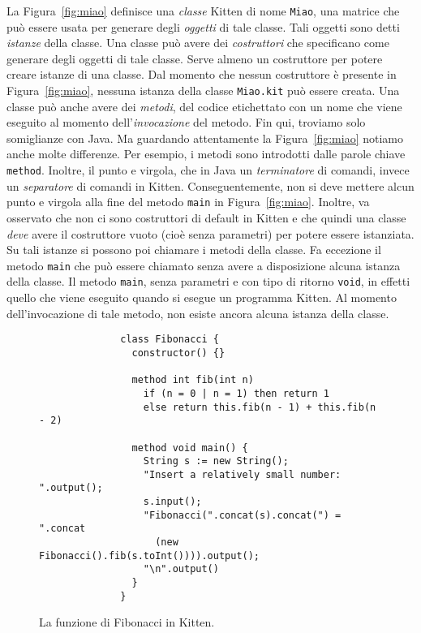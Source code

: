 La Figura~\ref{fig:miao} definisce una \emph{classe} Kitten di nome
\texttt{Miao}, \cioe una
matrice che pu\`o essere usata per generare degli \emph{oggetti} di tale
classe. Tali oggetti sono detti \emph{istanze} della classe.
Una classe pu\`o avere dei \emph{costruttori} che specificano come
generare degli oggetti di tale classe. Serve almeno un costruttore
per potere creare istanze di una classe. Dal momento che nessun costruttore
\`e presente in Figura~\ref{fig:miao}, nessuna istanza della classe
\texttt{Miao.kit} pu\`o essere creata. Una classe pu\`o anche avere
dei \emph{metodi}, \cioe del codice etichettato con un nome che viene
eseguito al momento dell'\emph{invocazione} del metodo. Fin qui, troviamo
solo somiglianze con Java. Ma guardando attentamente la Figura~\ref{fig:miao}
notiamo anche molte differenze. Per esempio, i metodi
sono introdotti dalle parole chiave \texttt{method}.
Inoltre, il punto e virgola, che in Java \e un \emph{terminatore} di comandi,
\e invece un \emph{separatore} di comandi in Kitten. Conseguentemente,
non si deve mettere alcun punto e virgola alla fine del metodo
\texttt{main} in Figura~\ref{fig:miao}. Inoltre, va osservato che non
ci sono costruttori di default in Kitten e che quindi una classe \emph{deve}
avere il costruttore vuoto (cio\`e senza parametri) per potere essere
istanziata. Su tali istanze si possono poi chiamare i metodi
della classe. Fa eccezione il metodo \texttt{main} che pu\`o essere
chiamato senza avere a disposizione alcuna istanza della classe.
Il metodo \texttt{main}, senza parametri e con tipo di ritorno \texttt{void},
\e in effetti quello che viene eseguito quando si esegue un programma Kitten.
Al momento dell'invocazione di tale metodo, non esiste ancora alcuna
istanza della classe.
%
%
\begin{figure}[t]
\begin{verbatim}
              class Fibonacci {
                constructor() {}

                method int fib(int n)
                  if (n = 0 | n = 1) then return 1
                  else return this.fib(n - 1) + this.fib(n - 2)

                method void main() {
                  String s := new String();
                  "Insert a relatively small number: ".output();
                  s.input();
                  "Fibonacci(".concat(s).concat(") = ".concat
                    (new Fibonacci().fib(s.toInt()))).output();
                  "\n".output()
                }
              }
\end{verbatim}
\caption{La funzione di Fibonacci in Kitten.}\label{fig:fibonacci}
\end{figure}
%
